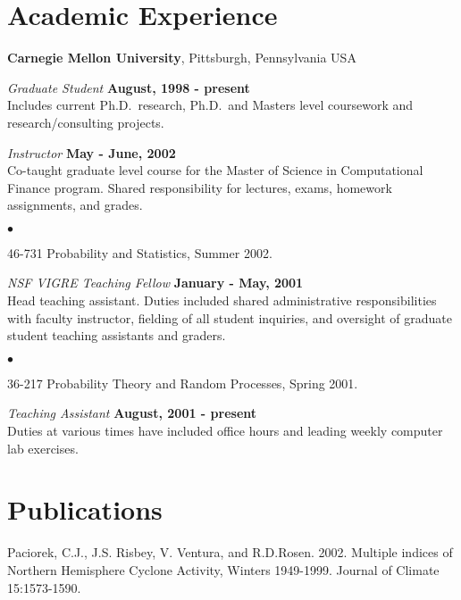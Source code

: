\documentclass[margin,line]{res}
\newenvironment{list2}{
  \begin{list}{$\bullet$}{%
      \setlength{\itemsep}{0in}
      \setlength{\parsep}{0in} \setlength{\parskip}{0in}
      \setlength{\topsep}{0in} \setlength{\partopsep}{0in} 
      \setlength{\leftmargin}{0.2in}}}{\end{list}}
\begin{document}
\begin{resume}
\section{\sc Academic Experience}
{\bf Carnegie Mellon University}, Pittsburgh, Pennsylvania USA

\vspace{-.3cm}
{\em Graduate Student} \hfill {\bf August, 1998 - present}\\
Includes current Ph.D.~research, Ph.D.~and Masters level coursework and
research/consulting projects.

{\em Instructor} \hfill {\bf May - June, 2002}\\
Co-taught graduate level course for the Master of Science in
Computational Finance program.  Shared responsibility for lectures, exams,
homework assignments, and  grades.  
\vspace*{.05in}  
\begin{list2}
\item 46-731 Probability and Statistics, Summer 2002.
\end{list2}


{\em NSF VIGRE Teaching Fellow} \hfill {\bf January - May, 2001}\\
Head teaching assistant.   
Duties included  shared administrative responsibilities with faculty
instructor, fielding of all student inquiries, and oversight of
graduate student teaching assistants and graders.
\vspace*{.05in}  
\begin{list2}
\item 36-217 Probability Theory and Random Processes, Spring 2001.
\end{list2}

{\em Teaching Assistant} \hfill {\bf August, 2001  - present}\\
Duties at various times have included 
office hours and leading weekly computer lab exercises.



\section{\sc Publications}
Paciorek, C.J., J.S. Risbey, V. Ventura, and R.D.Rosen. 2002. Multiple indices of Northern Hemisphere Cyclone
Activity, Winters 1949-1999. Journal of Climate 15:1573-1590.


\end{resume}
\end{document}
